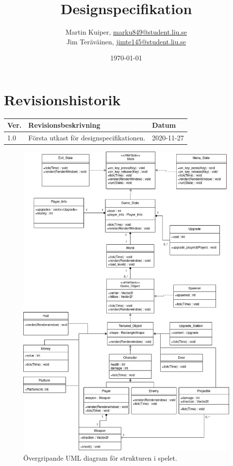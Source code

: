 \documentclass{TDP005mall}
\author{Martin Kuiper, \url{marku849@student.liu.se}\\
  Jim Teräväinen, \url{jimte145@student.liu.se}}
\title{Designspecifikation}
\date{\today}
\begin{document}
\projectpage
\section{Revisionshistorik}
\begin{table}[!h]
\begin{tabularx}{\linewidth}{|l|X|l|}
\hline
Ver. & Revisionsbeskrivning & Datum \\\hline
1.0 & Första utkast för designspecifikationen. & 2020-11-27 \\\hline
\end{tabularx}
\end{table}


\begin{figure}[H]
         \begin{center}
             \includegraphics[width=15cm]{Graphic/overview.png}
             \caption{\label{fig:1} Övergripande UML diagram för strukturen i spelet.}
         \end{center}
\end{figure}
\end{document}
